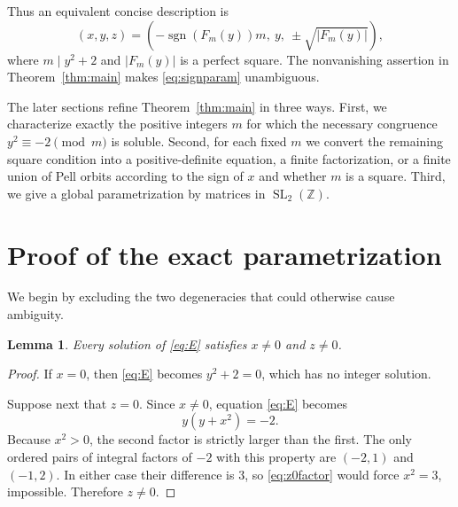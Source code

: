 \documentclass[11pt,a4paper]{amsart}
\numberwithin{equation}{section}
\newtheorem{lemma}[theorem]{Lemma}
\theoremstyle{definition}
\DeclareMathOperator{\sgn}{sgn}
\newcommand{\Z}{\mathbb Z}
\newcommand{\SL}{\operatorname{SL}}
\begin{document}
Thus an equivalent concise description is
\begin{equation}
 (x,y,z)=
 \left(-\sgn(F_m(y))m,\ y,\ \pm\sqrt{|F_m(y)|}\right),
 \label{eq:signparam}
\end{equation}
where \(m\mid y^2+2\) and \(|F_m(y)|\) is a perfect square.
The nonvanishing assertion in Theorem~\ref{thm:main} makes
\eqref{eq:signparam} unambiguous.

The later sections refine Theorem~\ref{thm:main} in three ways.
First, we characterize exactly the positive integers \(m\) for which
the necessary congruence \(y^2\equiv-2\pmod m\) is soluble.
Second, for each fixed \(m\) we convert the remaining square condition
into a positive-definite equation, a finite factorization, or a finite
union of Pell orbits according to the sign of \(x\) and whether \(m\)
is a square.  Third, we give a global parametrization by matrices in
\(\SL_2(\Z)\).

\section{Proof of the exact parametrization}

We begin by excluding the two degeneracies that could otherwise cause
ambiguity.

\begin{lemma}\label{lem:nonzero}
Every solution of \eqref{eq:E} satisfies \(x\ne0\) and \(z\ne0\).
\end{lemma}

\begin{proof}
If \(x=0\), then \eqref{eq:E} becomes \(y^2+2=0\), which has no
integer solution.

Suppose next that \(z=0\).  Since \(x\ne0\), equation \eqref{eq:E}
becomes
\begin{equation}
 y(y+x^2)=-2.
 \label{eq:z0factor}
\end{equation}
Because \(x^2>0\), the second factor is strictly larger than the first.
The only ordered pairs of integral factors of \(-2\) with this property
are \((-2,1)\) and \((-1,2)\).  In either case their difference is
\(3\), so \eqref{eq:z0factor} would force \(x^2=3\), impossible.
Therefore \(z\ne0\).
\end{proof}
\end{document}

